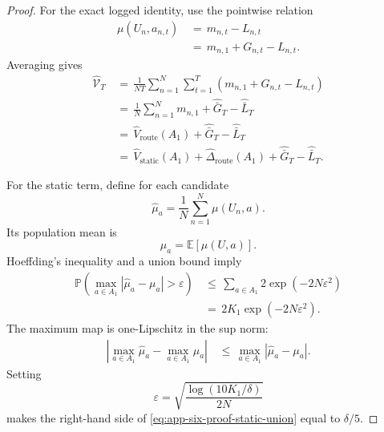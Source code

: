 \documentclass{article} %
\begin{document}
\begin{proof}
For the exact logged identity, use the pointwise relation
\begin{align}
\label{eq:app-six-proof-sample-pointwise}
\mu(U_n,a_{n,t})
&\,=\,
m_{n,t}-L_{n,t}
\\
&\,=\,
m_{n,1}+G_{n,t}-L_{n,t}.
\end{align}
Averaging gives
\begin{align}
\label{eq:app-six-proof-sample-average}
\widehat{\mathcal{V}}_T
&\,=\,
\frac{1}{NT}\sum_{n=1}^{N}\sum_{t=1}^{T}
\left(m_{n,1}+G_{n,t}-L_{n,t}\right)
\\
&\,=\,
\frac{1}{N}\sum_{n=1}^{N}m_{n,1}
+
\widehat{\bar G}_T
-
\widehat{\bar L}_T
\\
&\,=\,
\widehat V_{\mathrm{route}}(A_1)
+
\widehat{\bar G}_T
-
\widehat{\bar L}_T
\\
&\,=\,
\widehat V_{\mathrm{static}}(A_1)
+
\widehat\Delta_{\mathrm{route}}(A_1)
+
\widehat{\bar G}_T
-
\widehat{\bar L}_T.
\end{align}

For the static term, define for each candidate
\begin{equation}
\label{eq:app-six-proof-static-arm-mean}
\widehat \mu_a
=
\frac{1}{N}\sum_{n=1}^{N}\mu(U_n,a).
\end{equation}
Its population mean is
\begin{equation}
\label{eq:app-six-proof-static-pop-arm}
\mu_a
=
\mathbb{E}[\mu(U,a)].
\end{equation}
Hoeffding's inequality and a union bound imply
\begin{align}
\label{eq:app-six-proof-static-union}
\mathbb{P}\!\left(
\max_{a\in A_1}|\widehat\mu_a-\mu_a|>\varepsilon
\right)
&\,\le\,
\sum_{a\in A_1}
2\exp(-2N\varepsilon^2)
\\
&\,=\,
2K_1\exp(-2N\varepsilon^2).
\end{align}
The maximum map is one-Lipschitz in the sup norm:
\begin{align}
\label{eq:app-six-proof-max-lip}
\left|
\max_{a\in A_1}\widehat\mu_a
-
\max_{a\in A_1}\mu_a
\right|
&\,\le\,
\max_{a\in A_1}|\widehat\mu_a-\mu_a|.
\end{align}
Setting
\begin{equation}
\label{eq:app-six-proof-static-eps}
\varepsilon
=
\sqrt{\frac{\log(10K_1/\delta)}{2N}}
\end{equation}
makes the right-hand side of \eqref{eq:app-six-proof-static-union} equal to \(\delta/5\).


\end{proof}
\end{document}
